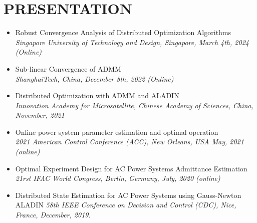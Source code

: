 \documentclass[paper=a4,fontsize=11pt]{scrartcl} %
\newcommand{\NewPart}[1]{\section*{\uppercase{#1}}}
\begin{document}
			\NewPart{PRESENTATION}{}
			\begin{itemize}
				\item  {
					{Robust Convergence Analysis of Distributed Optimization Algorithms}\\
					\emph{Singapore University of Technology and Design, Singapore, March 4th, 2024 (Online)
				} }
				
				\item  {
					{Sub-linear Convergence of ADMM}\\
					\emph{ShanghaiTech, China, December 8th, 2022 (Online)
				} }
				
				\item  {
					{Distributed Optimization with ADMM and ALADIN}\\
					\emph{Innovation Academy for Microsatellite, Chinese Academy of Sciences, China,
						November, 2021
				} }
				
				\item  {
					{Online power system parameter estimation and optimal operation}\\
					\emph{2021 American Control Conference (ACC), New Orleans, USA May, 2021 (online)
				} }
				
				\item  {
					Optimal Experiment Design for AC Power Systems Admittance Estimation\\
					\emph{21rst IFAC World Congress, Berlin, Germany, July, 2020 (online)
				} }
				
				\item  {
					Distributed State Estimation for AC Power Systems using Gauss-Newton ALADIN 
					\emph{58th IEEE Conference on Decision and Control (CDC),
						Nice, France, December, 2019.} }
			\end{itemize}
			
\end{document}
